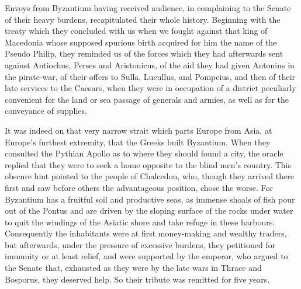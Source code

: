 
Envoys from Byzantium having received audience, in complaining to the Senate of their heavy burdens, recapitulated their whole history. Beginning with the treaty which they concluded with us when we fought against that king of Macedonia whose supposed spurious birth acquired for him the name of the Pseudo Philip, they reminded us of the forces which they had afterwards sent against Antiochus, Perses and Aristonicus, of the aid they had given Antonius in the pirate-war, of their offers to Sulla, Lucullus, and Pompeius, and then of their late services to the Caesars, when they were in occupation of a district peculiarly convenient for the land or sea passage of generals and armies, as well as for the conveyance of supplies.


It was indeed on that very narrow strait which parts Europe from Asia, at Europe's furthest extremity, that the Greeks built Byzantium. When they consulted the Pythian Apollo as to where they should found a city, the oracle replied that they were to seek a home opposite to the blind men's country. This obscure hint pointed to the people of Chalcedon, who, though they arrived there first and saw before others the advantageous position, chose the worse. For Byzantium has a fruitful soil and productive seas, as immense shoals of fish pour out of the Pontus and are driven by the sloping surface of the rocks under water to quit the windings of the Asiatic shore and take refuge in these harbours. Consequently the inhabitants were at first money-making and wealthy traders, but afterwards, under the pressure of excessive burdens, they petitioned for immunity or at least relief, and were supported by the emperor, who argued to the Senate that, exhausted as they were by the late wars in Thrace and Bosporus, they deserved help. So their tribute was remitted for five years.


